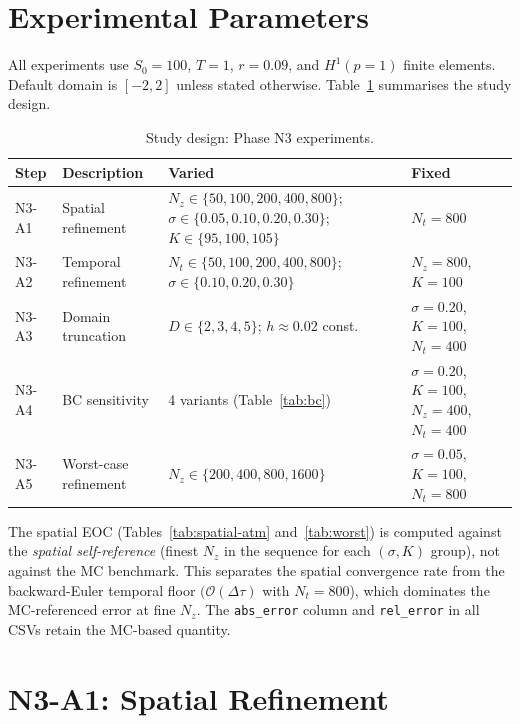 \documentclass[11pt,a4paper]{article}
\newcommand{\Nz}{N_z}
\newcommand{\Nt}{N_t}
\newcommand{\bigo}[1]{\mathcal{O}(#1)}
\begin{document}
\section{Experimental Parameters}

All experiments use $S_0 = 100$, $T = 1$, $r = 0.09$, and $H^1(p=1)$
finite elements.  Default domain is $[-2, 2]$ unless stated otherwise.
Table~\ref{tab:params} summarises the study design.

\begin{table}[htbp]
\centering
\caption{Study design: Phase N3 experiments.}
\label{tab:params}
\small
\begin{tabular}{@{}p{1.4cm}p{3.0cm}p{6.0cm}p{3.5cm}@{}}
\toprule
Step & Description & Varied & Fixed \\
\midrule
N3-A1 & Spatial refinement &
  $\Nz \in \{50,100,200,400,800\}$;
  $\sigma \in \{0.05,0.10,0.20,0.30\}$;
  $K \in \{95,100,105\}$ &
  $\Nt = 800$ \\[4pt]
N3-A2 & Temporal refinement &
  $\Nt \in \{50,100,200,400,800\}$;
  $\sigma \in \{0.10,0.20,0.30\}$ &
  $\Nz = 800$, $K = 100$ \\[4pt]
N3-A3 & Domain truncation &
  $D \in \{2,3,4,5\}$; $h \approx 0.02$ const. &
  $\sigma = 0.20$, $K = 100$, $\Nt = 400$ \\[4pt]
N3-A4 & BC sensitivity &
  4 variants (Table~\ref{tab:bc}) &
  $\sigma = 0.20$, $K = 100$,
  $\Nz = 400$, $\Nt = 400$ \\[4pt]
N3-A5 & Worst-case refinement &
  $\Nz \in \{200,400,800,1600\}$ &
  $\sigma = 0.05$, $K = 100$, $\Nt = 800$ \\
\bottomrule
\end{tabular}
\end{table}

The spatial EOC (Tables~\ref{tab:spatial-atm} and~\ref{tab:worst}) is
computed against the \emph{spatial self-reference} (finest $\Nz$ in the
sequence for each $(\sigma, K)$ group), not against the MC benchmark.
This separates the spatial convergence rate from the backward-Euler
temporal floor $(\bigo{\Delta\tau}$ with $\Nt = 800$), which dominates
the MC-referenced error at fine $\Nz$.  The \texttt{abs\_error} column
and \texttt{rel\_error} in all CSVs retain the MC-based quantity.

\section{N3-A1: Spatial Refinement}
\end{document}
